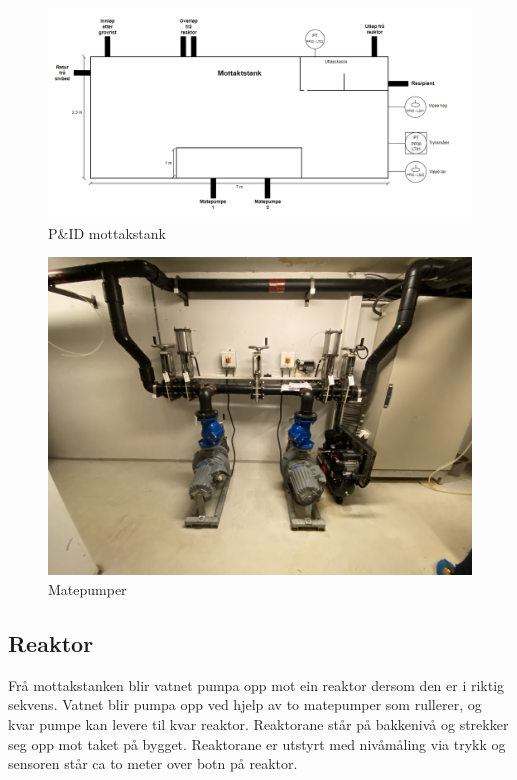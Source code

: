 
\begin{figure}[htbp]
    \centering
    \includegraphics[width=1\textwidth]{Figurar/Mottakstank.png}
    \caption{P\&ID mottakstank}\label{fig:Mottakstank}
\end{figure}

\begin{figure}[htbp]
    \centering
    \includegraphics[width=1\textwidth]{Bilder/Bilde pumper.jpg}
    \caption{Matepumper}\label{fig:Matepumper}
\end{figure}

\newpage
\subsection{Reaktor}

Frå mottakstanken blir vatnet pumpa opp mot ein reaktor dersom den er i riktig sekvens.
Vatnet blir pumpa opp ved hjelp av to matepumper som rullerer, og kvar pumpe kan
levere til kvar reaktor. 
Reaktorane står på bakkenivå og strekker seg opp mot taket på bygget.
Reaktorane er utstyrt med nivåmåling via trykk og sensoren står ca to meter over botn på reaktor.

